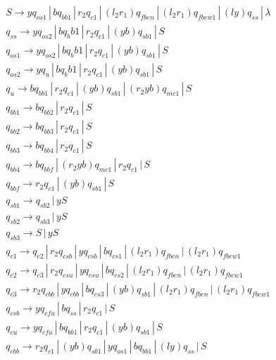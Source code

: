 \documentclass{article}
\begin{document}
\begin{mylist}
\begin{align*}
&S \rightarrow yq_{os1} \, | \, bq_{bb1} \, | \, r_2q_{c1} \, | \, (l_2r_1)q_{fben} \, | \, (l_2r_1)q_{fbew1} \, | \, (ly)q_{ss} \, | \, \lambda \\
&q_{ss} \rightarrow yq_{os2} \, | \, b{q_bb1} \, | \, r_2q_{c1} \, | \, (yb)q_{sb1} \, | \, S\\
&q_{os1} \rightarrow yq_{os2} \, | \, b{q_bb1} \, | \, r_2q_{c1} \, | \, (yb)q_{sb1} \, | \, S\\
&q_{os2} \rightarrow yq_{u} \, | \, b{q_bb1} \, | \, r_2q_{c1} \, | \, (yb)q_{sb1} \, | \, S\\
&q_{u} \rightarrow bq_{bb1} \, | \, r_2q_{c1} \, | \,(yb)q_{sb1} \, | \, (r_2yb)q_{mc1} \, | \, S\\
&q_{bb1} \rightarrow bq_{bb2} \, | \, r_2q_{c1} \, | \, S \\ 
&q_{bb2} \rightarrow bq_{bb3} \, | \, r_2q_{c1} \, | \, S \\ 
&q_{bb3} \rightarrow bq_{bb4} \, | \, r_2q_{c1} \, | \, S \\ 
&q_{bb4} \rightarrow bq_{bbf} \, | \, (r_2yb)q_{mc1} \, | \, r_2q_{c1} \, | \, S \\ 
&q_{bbf} \rightarrow r_2q_{c1} \, | \, (yb)q_{sb1} \, | \, S \\ 
&q_{sb1} \rightarrow q_{sb2} \, | \, yS \\ 
&q_{sb2} \rightarrow q_{sb3} \, | \, yS \\ 
&q_{sb3} \rightarrow S \, | \, yS \\ 
&q_{c1} \rightarrow q_{c2} \, | \,  r_2q_{csb} \, | \, yq_{csb} \, | \, bq_{cs1} \, | \, (l_2r_1)q_{fben} \, | \, (l_2r_1)q_{fbew1}\\ 
&q_{c2} \rightarrow q_{c3} \, | \,  r_2q_{csu} \, | \, yq_{csu} \, | \, bq_{cs2} \, | \, (l_2r_1)q_{fben} \, | \, (l_2r_1)q_{fbew1}\\ 
&q_{c3} \rightarrow r_2q_{cbb} \, | \,  yq_{cbb} \, | \, bq_{cs3} \, | \, (yb)q_{sb1} \, | \, (l_2r_1)q_{fben} \, | \, (l_2r_1)q_{fbew1}\ \\ 
&q_{csb} \rightarrow yq_{cfu} \, | \,  bq_{ss} \, | \, r_2q_{c1} \, | \, S \\ 
&q_{cu} \rightarrow yq_{cfu} \, | \,  bq_{bb1} \, | \, r_2q_{c1} \, | \, (yb)q_{sb1} \, | \, S \\ 
&q_{cbb} \rightarrow r_2q_{c1} \, | \,  (yb)q_{sb1} \, | \, yq_{os1} \, | \, bq_{bb1} \, | \, (ly)q_{ss} \, | \, S \\ 

\end{align*}
\end{mylist}
\end{document}
